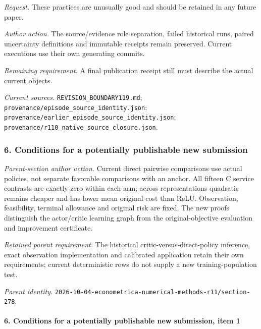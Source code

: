 \par\emph{Request.} These practices are unusually good and should be retained in any future paper.

\par\emph{Author action.} The source/\allowbreak{}evidence role separation, failed historical runs, paired uncertainty definitions and immutable receipts remain preserved. Current executions use their own generating commits.

\par\emph{Remaining requirement.} A final publication receipt still must describe the actual current objects.

\par\emph{Current sources.} \nolinkurl{REVISION_BOUNDARY119.md}; \nolinkurl{provenance/episode_source_identity.json}; \nolinkurl{provenance/earlier_episode_source_identity.json}; \nolinkurl{provenance/r110_native_source_closure.json}.

\subsubsection{6. Conditions for a potentially publishable new submission}

\emph{Parent-section author action.} Current direct pairwise comparisons use actual policies, not separate favorable comparisons with an anchor. All fifteen C service contrasts are exactly zero within each arm; across representations quadratic remains cheaper and has lower mean original cost than ReLU. Observation, feasibility, terminal allowance and original risk are fixed. The new proofs distinguish the actor/\allowbreak{}critic learning graph from the original-objective evaluation and improvement certificate.

\par\emph{Retained parent requirement.} The historical critic-versus-direct-policy inference, exact observation implementation and calibrated application retain their own requirements; current deterministic rows do not supply a new training-population test.

\par\emph{Parent identity.} \nolinkurl{2026-10-04-econometrica-numerical-methods-r11/section-278}.

\paragraph{6. Conditions for a potentially publishable new submission, item 1}

